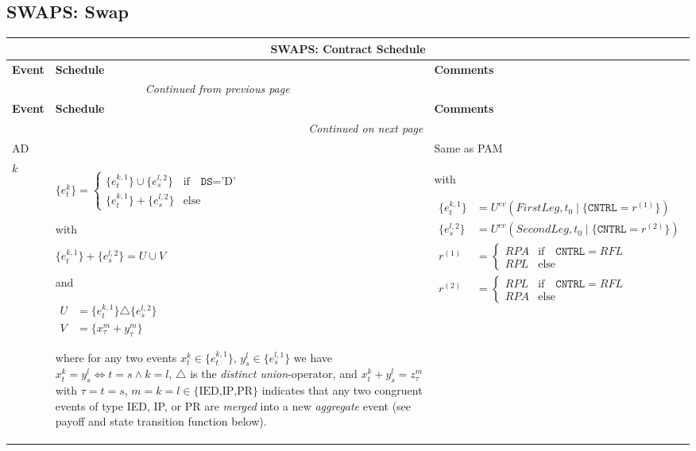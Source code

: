 \documentclass[9pt,oneside]{amsart}
\newenvironment{schedule}[1]{
	\hfill %
	\begin{longtable}{| p{0.05\textwidth} | p{0.5\textwidth} |  p{0.4\textwidth} |}
	\multicolumn{3}{c}{\textbf{#1: Contract Schedule}}\\
	\hline
	\textbf{Event} & \textbf{Schedule} & \textbf{Comments} \\
	\hline
	\endfirsthead
	\multicolumn{2}{c}{\textit{Continued from previous page}} \\
	\hline
	\textbf{Event} & \textbf{Schedule} & \textbf{Comments} \\
	\hline
	\endhead
	\hline \multicolumn{2}{r}{\textit{Continued on next page}} \\
	\endfoot
	\endlastfoot
}{%
	\hline
	\end{longtable}
}
\newcommand{\attr}[1]{\texttt{#1}}
\newcommand{\cldev}[3]{U^{ev}(#1,#2 \mid\{#3\})}
\begin{document}

\subsection{SWAPS: Swap}\label{sec:swaps}


\begin{schedule}{SWAPS}
	AD & & Same as PAM \\
	\hline
	$k$ & $\{e_t^k\} = \begin{cases}
				\{e_t^{k,1}\}\cup \{e_s^{l,2}\} & \text{if}\quad \attr{DS}=\text{'D'} \\
				\{e_t^{k,1}\} + \{e_s^{l,2}\} & \text{else} \end{cases}$ \par
	with\par
	$\{e_t^{k,1}\}+\{e_s^{l,2}\} = U \cup V$\par
	and\par
	{$\begin{aligned}
		U &= \{e_t^{k,1}\} \triangle \{e_s^{l,2}\}\\
		V &= \{x_\tau^m+y_\tau^m\}
	\end{aligned}$} \par
	where for any two events $x_t^k\in\{e_t^{k,1}\}$, $y_s^l\in\{e_s^{l,1}\}$ we have $x_t^k=y_s^l \iff t=s \land k=l$, $\triangle$ is the \textit{distinct union}-operator, and $x_t^k+y_s^l=z_\tau^m$ with $\tau=t=s$, $m=k=l\in\{\text{IED,IP,PR}\}$ indicates that any two congruent events of type IED, IP, or PR are \textit{merged} into a new \textit{aggregate} event (see payoff and state transition function below).
		& with\par
			{$\begin{aligned}
				\{e_t^{k,1}\} &= \cldev{FirstLeg}{t_0}{\attr{CNTRL}=r^{(1)}} \\
				\{e_s^{l,2}\} &= \cldev{SecondLeg}{t_0}{\attr{CNTRL}=r^{(2)}} \\
				r^{(1)} &= \begin{cases} RPA & \text{if}\quad \attr{CNTRL}=RFL \\
					RPL & \text{else} \end{cases} \\
				r^{(2)} &= \begin{cases} RPL & \text{if}\quad \attr{CNTRL}=RFL \\
					RPA & \text{else} \end{cases}
			\end{aligned}$} \\
\end{schedule}
\end{document}

